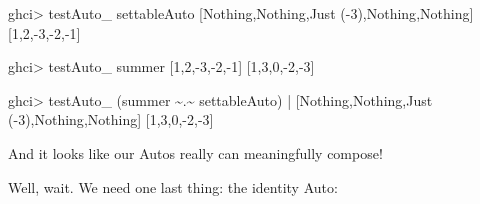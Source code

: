 \documentclass[]{article}
\newenvironment{Shaded}{}{}
\newcommand{\CommentTok}[1]{\textcolor[rgb]{0.38,0.63,0.69}{\textit{#1}}}
\newcommand{\DataTypeTok}[1]{\textcolor[rgb]{0.56,0.13,0.00}{#1}}
\newcommand{\DecValTok}[1]{\textcolor[rgb]{0.25,0.63,0.44}{#1}}
\newcommand{\NormalTok}[1]{#1}
\newcommand{\OperatorTok}[1]{\textcolor[rgb]{0.40,0.40,0.40}{#1}}
\newcommand{\OtherTok}[1]{\textcolor[rgb]{0.00,0.44,0.13}{#1}}
\begin{document}
\begin{Shaded}
\begin{Highlighting}[]
\NormalTok{ghci}\OperatorTok{\textgreater{}}\NormalTok{ testAuto\_ settableAuto [}\DataTypeTok{Nothing}\NormalTok{,}\DataTypeTok{Nothing}\NormalTok{,}\DataTypeTok{Just}\NormalTok{ (}\OperatorTok{{-}}\DecValTok{3}\NormalTok{),}\DataTypeTok{Nothing}\NormalTok{,}\DataTypeTok{Nothing}\NormalTok{]}
\NormalTok{[}\DecValTok{1}\NormalTok{,}\DecValTok{2}\NormalTok{,}\OperatorTok{{-}}\DecValTok{3}\NormalTok{,}\OperatorTok{{-}}\DecValTok{2}\NormalTok{,}\OperatorTok{{-}}\DecValTok{1}\NormalTok{]}

\NormalTok{ghci}\OperatorTok{\textgreater{}}\NormalTok{ testAuto\_ summer [}\DecValTok{1}\NormalTok{,}\DecValTok{2}\NormalTok{,}\OperatorTok{{-}}\DecValTok{3}\NormalTok{,}\OperatorTok{{-}}\DecValTok{2}\NormalTok{,}\OperatorTok{{-}}\DecValTok{1}\NormalTok{]}
\NormalTok{[}\DecValTok{1}\NormalTok{,}\DecValTok{3}\NormalTok{,}\DecValTok{0}\NormalTok{,}\OperatorTok{{-}}\DecValTok{2}\NormalTok{,}\OperatorTok{{-}}\DecValTok{3}\NormalTok{]}

\NormalTok{ghci}\OperatorTok{\textgreater{}}\NormalTok{ testAuto\_ (summer }\OperatorTok{\textasciitilde{}.\textasciitilde{}}\NormalTok{ settableAuto)}
    \OperatorTok{|}\NormalTok{     [}\DataTypeTok{Nothing}\NormalTok{,}\DataTypeTok{Nothing}\NormalTok{,}\DataTypeTok{Just}\NormalTok{ (}\OperatorTok{{-}}\DecValTok{3}\NormalTok{),}\DataTypeTok{Nothing}\NormalTok{,}\DataTypeTok{Nothing}\NormalTok{]}
\NormalTok{[}\DecValTok{1}\NormalTok{,}\DecValTok{3}\NormalTok{,}\DecValTok{0}\NormalTok{,}\OperatorTok{{-}}\DecValTok{2}\NormalTok{,}\OperatorTok{{-}}\DecValTok{3}\NormalTok{]}
\end{Highlighting}
\end{Shaded}

And it looks like our Autos really can meaningfully compose!

Well, wait. We need one last thing: the identity Auto:

\begin{Shaded}
\end{Shaded}
\end{document}
